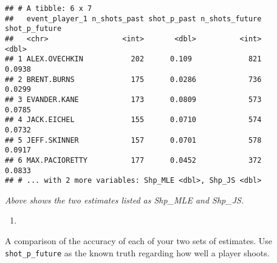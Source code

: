 \documentclass[]{article}
\newenvironment{Shaded}{\begin{snugshade}}{\end{snugshade}}
\newcommand{\DataTypeTok}[1]{\textcolor[rgb]{0.13,0.29,0.53}{#1}}
\newcommand{\KeywordTok}[1]{\textcolor[rgb]{0.13,0.29,0.53}{\textbf{#1}}}
\newcommand{\NormalTok}[1]{#1}
\newcommand{\OperatorTok}[1]{\textcolor[rgb]{0.81,0.36,0.00}{\textbf{#1}}}
\newcommand{\StringTok}[1]{\textcolor[rgb]{0.31,0.60,0.02}{#1}}
\begin{document}
\begin{Shaded}
\end{Shaded}

\begin{verbatim}
## # A tibble: 6 x 7
##   event_player_1 n_shots_past shot_p_past n_shots_future shot_p_future
##   <chr>                 <int>       <dbl>          <int>         <dbl>
## 1 ALEX.OVECHKIN           202      0.109             821        0.0938
## 2 BRENT.BURNS             175      0.0286            736        0.0299
## 3 EVANDER.KANE            173      0.0809            573        0.0785
## 4 JACK.EICHEL             155      0.0710            574        0.0732
## 5 JEFF.SKINNER            157      0.0701            578        0.0917
## 6 MAX.PACIORETTY          177      0.0452            372        0.0833
## # ... with 2 more variables: Shp_MLE <dbl>, Shp_JS <dbl>
\end{verbatim}

\emph{Above shows the two estimates listed as Shp\_MLE and Shp\_JS.}

\begin{enumerate}
\def\labelenumi{\roman{enumi})}
\setcounter{enumi}{1}
\item
\end{enumerate}

A comparison of the accuracy of each of your two sets of estimates. Use
\texttt{shot\_p\_future} as the known truth regarding how well a player
shoots.

\begin{Shaded}
\end{Shaded}
\end{document}
